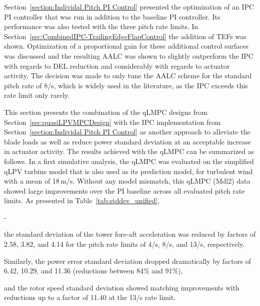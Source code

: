 Section~\ref{section:Individal Pitch PI Control} presented the optimization of an IPC PI controller that was run in addition to the baseline PI controller. Its performance was also tested with the three pitch rate limits. In Section~\ref{sec:CombinedIPC-TrailingEdgeFlapControl} the addition of TEFs was shown. Optimization of a proportional gain for these additional control surfaces was discussed and the resulting AALC was shown to slightly outperform the IPC with regards to DEL reduction and considerably with regards to actuator activity. The decision was made to only tune the AALC scheme for the standard pitch rate of 8\textdegree/s, which is widely used in the literature, as the IPC exceeds this rate limit only rarely.

This section presents the combination of the qLMPC designs from Section~\ref{sec:quasiLPVMPCDesign} with the IPC implementation from Section~\ref{section:Individal Pitch PI Control} as another approach to alleviate the blade loads as well as reduce power standard deviation at an acceptable increase in actuator activity.
The results achieved with the qLMPC can be summarized as follows. In a first simulative analysis, the qLMPC was evaluated on the simplified qLPV turbine model that is also
used as its prediction model, for turbulent wind with a mean of 18\,m/s. Without any model
mismatch, this qLMPC (Mdl2) data showed large improvements over the PI baseline across all evaluated pitch rate limits.
As presented in Table~\ref{tab:stddev_unified}, 
\begin{list}
    {-}{\setlength{\topsep}{5pt}\setlength{\partopsep}{5pt}\setlength{\itemsep}{0pt}\setlength{\parsep}{0pt}}
    \item the standard deviation of the tower fore-aft acceleration was reduced
    by factors of 2.58, 3.82, and 4.14 for the pitch rate limits of 4\textdegree/s, 8\textdegree/s, and
    13\textdegree/s, respectively.
    \item Similarly, the power error standard deviation dropped dramatically
    by factors of 6.42, 10.29, and 11.36 (reductions between 84\% and 91\%), 
    \item and the rotor speed
    standard deviation showed matching improvements with reductions up to a factor of 11.40 at the
    13\textdegree/s rate limit. 
\end{list}
